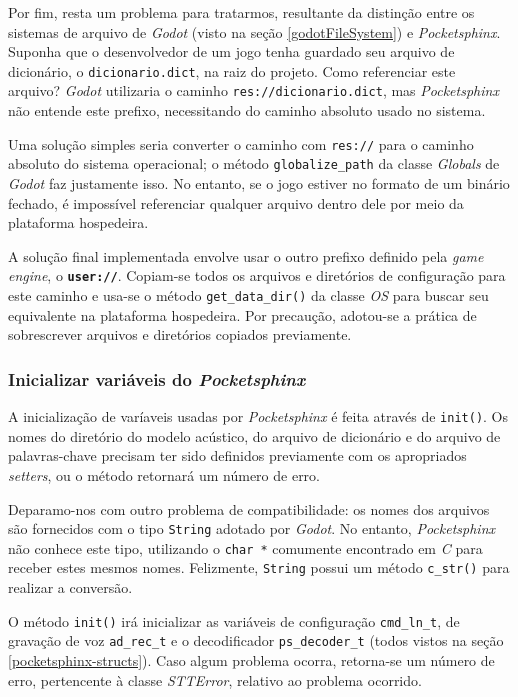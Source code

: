 Por fim, resta um problema para tratarmos, resultante da distinção entre os sistemas de arquivo de \textit{Godot} (visto na seção \ref{godotFileSystem}) e \textit{Pocketsphinx}. Suponha que o desenvolvedor de um jogo tenha guardado seu arquivo de dicionário, o \texttt{dicionario.dict}, na raiz do projeto. Como referenciar este arquivo? \textit{Godot} utilizaria o caminho \texttt{res://dicionario.dict}, mas \textit{Pocketsphinx} não entende este prefixo, necessitando do caminho absoluto usado no sistema.

Uma solução simples seria converter o caminho com \texttt{res://} para o caminho absoluto do sistema operacional; o método \texttt{globalize\_path} da classe \textit{Globals} de \textit{Godot} faz justamente isso. No entanto, se o jogo estiver no formato de um binário fechado, é impossível referenciar qualquer arquivo dentro dele por meio da plataforma hospedeira.

A solução final implementada envolve usar o outro prefixo definido pela \textit{game engine}, o \textbf{\texttt{user://}}. Copiam-se todos os arquivos e diretórios de configuração para este caminho e usa-se o método \texttt{get\_data\_dir()} da classe \textit{OS} para buscar seu equivalente na plataforma hospedeira. Por precaução, adotou-se a prática de sobrescrever arquivos e diretórios copiados previamente.

\subsubsection{Inicializar variáveis do \textit{Pocketsphinx}}

A inicialização de varíaveis usadas por \textit{Pocketsphinx} é feita através de \texttt{init()}. Os nomes do diretório do modelo acústico, do arquivo de dicionário e do arquivo de palavras-chave precisam ter sido definidos previamente com os apropriados \textit{setters}, ou o método retornará um número de erro.

Deparamo-nos com outro problema de compatibilidade: os nomes dos arquivos são fornecidos com o tipo \texttt{String} adotado por \textit{Godot}. No entanto, \textit{Pocketsphinx} não conhece este tipo, utilizando o \texttt{char *} comumente encontrado em \textit{C} para receber estes mesmos nomes. Felizmente, \texttt{String} possui um método \texttt{c\_str()} para realizar a conversão.


O método \texttt{init()} irá inicializar as variáveis de configuração \texttt{cmd\_ln\_t}, de gravação de voz \texttt{ad\_rec\_t} e o decodificador \texttt{ps\_decoder\_t} (todos vistos na seção \ref{pocketsphinx-structs}). Caso algum problema ocorra, retorna-se um número de erro, pertencente à classe \mbox{\textit{STTError}}, relativo ao problema ocorrido.

